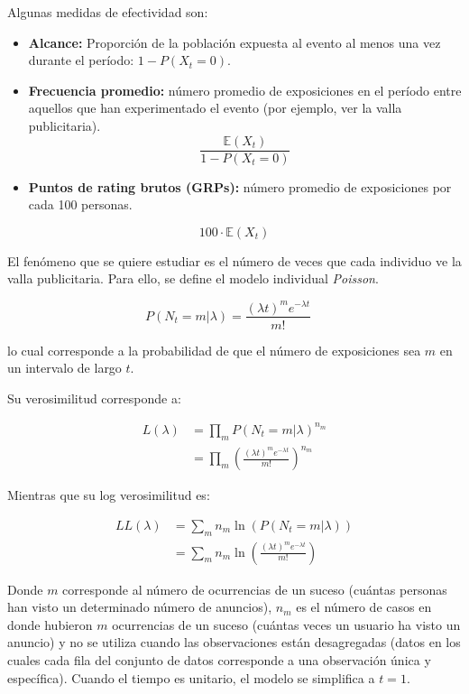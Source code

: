 \documentclass[
]{book}
\begin{document}
Algunas medidas de efectividad son:

\begin{itemize}
\item
  \textbf{Alcance:} Proporción de la población expuesta al evento al menos
  una vez durante el período: \(1 − P(X_t = 0)\).
\item
  \textbf{Frecuencia promedio:} número promedio de exposiciones en el
  período entre aquellos que han experimentado el evento (por ejemplo,
  ver la valla publicitaria). \[\frac{\mathbb{E}(X_t)}{1-P(X_t =0)}\]
\item
  \textbf{Puntos de rating brutos (GRPs):} número promedio de exposiciones
  por cada 100 personas.
\end{itemize}

\[100 \cdot \mathbb{E}(X_t)\]

El fenómeno que se quiere estudiar es el número de veces que cada
individuo ve la valla publicitaria. Para ello, se define el modelo
individual \emph{Poisson}.

\[
P(N_t=m|\lambda) = \frac{(\lambda t)^m e^{-\lambda t}}{m!} \quad \label{eq:poisson}
\]

lo cual corresponde a la probabilidad de que el número de exposiciones
sea \(m\) en un intervalo de largo \(t\).

Su verosimilitud corresponde a:

\[
\begin{aligned}
L(\lambda) &= \prod_{m} P(N_t = m | \lambda)^{n_m} \\
&= \prod_{m} \left( \frac{(\lambda t)^m e^{-\lambda t}}{m!} \right)^{n_m}
\end{aligned}
\]

Mientras que su log verosimilitud es:

\[
\begin{aligned}
LL(\lambda) &= \sum_{m} n_m \ln \left( P(N_t = m | \lambda) \right) \\
&= \sum_{m} n_m \ln \left( \frac{(\lambda t)^m e^{-\lambda t}}{m!} \right)
\end{aligned}
\]

Donde \(m\) corresponde al número de ocurrencias de un suceso (cuántas
personas han visto un determinado número de anuncios), \(n_m\) es el
número de casos en donde hubieron \(m\) ocurrencias de un suceso (cuántas
veces un usuario ha visto un anuncio) y no se utiliza cuando las
observaciones están desagregadas (datos en los cuales cada fila del
conjunto de datos corresponde a una observación única y específica).
Cuando el tiempo es unitario, el modelo se simplifica a \(t = 1\).
\end{document}
